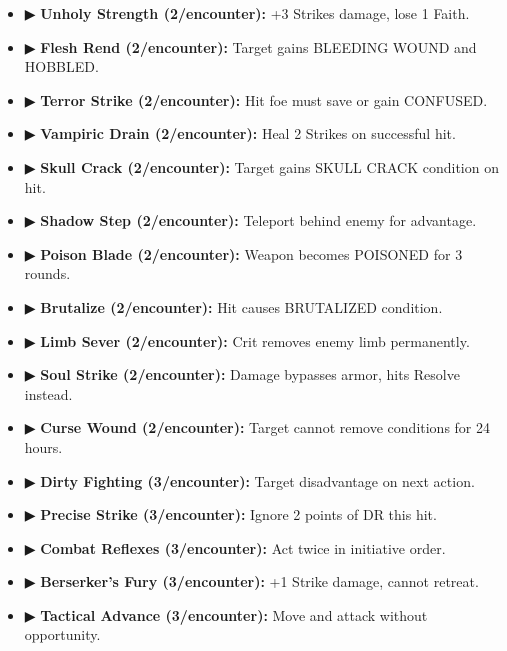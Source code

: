 \documentclass[10pt,twoside]{article}
\begin{document}
\begin{multicols}{2}
{\begin{itemize}
\item ▶ \textbf{Unholy Strength (2/encounter):} +3 Strikes damage, lose 1 Faith.

\item ▶ \textbf{Flesh Rend (2/encounter):} Target gains BLEEDING WOUND and HOBBLED.

\item ▶ \textbf{Terror Strike (2/encounter):} Hit foe must save or gain CONFUSED.

\item ▶ \textbf{Vampiric Drain (2/encounter):} Heal 2 Strikes on successful hit.

\item ▶ \textbf{Skull Crack (2/encounter):} Target gains SKULL CRACK condition on hit.

\item ▶ \textbf{Shadow Step (2/encounter):} Teleport behind enemy for advantage.

\item ▶ \textbf{Poison Blade (2/encounter):} Weapon becomes POISONED for 3 rounds.

\item ▶ \textbf{Brutalize (2/encounter):} Hit causes BRUTALIZED condition.

\item ▶ \textbf{Limb Sever (2/encounter):} Crit removes enemy limb permanently.

\item ▶ \textbf{Soul Strike (2/encounter):} Damage bypasses armor, hits Resolve instead.

\item ▶ \textbf{Curse Wound (2/encounter):} Target cannot remove conditions for 24 hours.

\item ▶ \textbf{Dirty Fighting (3/encounter):} Target disadvantage on next action.

\item ▶ \textbf{Precise Strike (3/encounter):} Ignore 2 points of DR this hit.

\item ▶ \textbf{Combat Reflexes (3/encounter):} Act twice in initiative order.

\item ▶ \textbf{Berserker's Fury (3/encounter):} +1 Strike damage, cannot retreat.

\item ▶ \textbf{Tactical Advance (3/encounter):} Move and attack without opportunity.


\end{itemize}}
\end{multicols}
\end{document}
